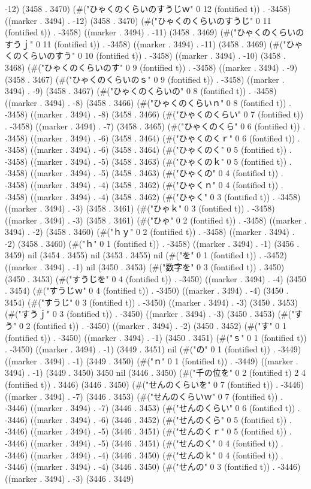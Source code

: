 -12) (3458 . 3470) (#("ひゃくのくらいのすうじｗ" 0 12 (fontified t)) . -3458) ((marker . 3494) . -12) (3458 . 3470) (#("ひゃくのくらいのすうじ" 0 11 (fontified t)) . -3458) ((marker . 3494) . -11) (3458 . 3469) (#("ひゃくのくらいのすうｊ" 0 11 (fontified t)) . -3458) ((marker . 3494) . -11) (3458 . 3469) (#("ひゃくのくらいのすう" 0 10 (fontified t)) . -3458) ((marker . 3494) . -10) (3458 . 3468) (#("ひゃくのくらいのす" 0 9 (fontified t)) . -3458) ((marker . 3494) . -9) (3458 . 3467) (#("ひゃくのくらいのｓ" 0 9 (fontified t)) . -3458) ((marker . 3494) . -9) (3458 . 3467) (#("ひゃくのくらいの" 0 8 (fontified t)) . -3458) ((marker . 3494) . -8) (3458 . 3466) (#("ひゃくのくらいｎ" 0 8 (fontified t)) . -3458) ((marker . 3494) . -8) (3458 . 3466) (#("ひゃくのくらい" 0 7 (fontified t)) . -3458) ((marker . 3494) . -7) (3458 . 3465) (#("ひゃくのくら" 0 6 (fontified t)) . -3458) ((marker . 3494) . -6) (3458 . 3464) (#("ひゃくのくｒ" 0 6 (fontified t)) . -3458) ((marker . 3494) . -6) (3458 . 3464) (#("ひゃくのく" 0 5 (fontified t)) . -3458) ((marker . 3494) . -5) (3458 . 3463) (#("ひゃくのｋ" 0 5 (fontified t)) . -3458) ((marker . 3494) . -5) (3458 . 3463) (#("ひゃくの" 0 4 (fontified t)) . -3458) ((marker . 3494) . -4) (3458 . 3462) (#("ひゃくｎ" 0 4 (fontified t)) . -3458) ((marker . 3494) . -4) (3458 . 3462) (#("ひゃく" 0 3 (fontified t)) . -3458) ((marker . 3494) . -3) (3458 . 3461) (#("ひゃｋ" 0 3 (fontified t)) . -3458) ((marker . 3494) . -3) (3458 . 3461) (#("ひゃ" 0 2 (fontified t)) . -3458) ((marker . 3494) . -2) (3458 . 3460) (#("ｈｙ" 0 2 (fontified t)) . -3458) ((marker . 3494) . -2) (3458 . 3460) (#("ｈ" 0 1 (fontified t)) . -3458) ((marker . 3494) . -1) (3456 . 3459) nil (3454 . 3455) nil (3453 . 3455) nil (#("を" 0 1 (fontified t)) . -3452) ((marker . 3494) . -1) nil (3450 . 3453) (#("数字を" 0 3 (fontified t)) . 3450) (3450 . 3453) (#("すうじを" 0 4 (fontified t)) . -3450) ((marker . 3494) . -4) (3450 . 3454) (#("すうじｗ" 0 4 (fontified t)) . -3450) ((marker . 3494) . -4) (3450 . 3454) (#("すうじ" 0 3 (fontified t)) . -3450) ((marker . 3494) . -3) (3450 . 3453) (#("すうｊ" 0 3 (fontified t)) . -3450) ((marker . 3494) . -3) (3450 . 3453) (#("すう" 0 2 (fontified t)) . -3450) ((marker . 3494) . -2) (3450 . 3452) (#("す" 0 1 (fontified t)) . -3450) ((marker . 3494) . -1) (3450 . 3451) (#("ｓ" 0 1 (fontified t)) . -3450) ((marker . 3494) . -1) (3449 . 3451) nil (#("の" 0 1 (fontified t)) . -3449) ((marker . 3494) . -1) (3449 . 3450) (#("ｎ" 0 1 (fontified t)) . -3449) ((marker . 3494) . -1) (3449 . 3450) 3450 nil (3446 . 3450) (#("千の位を" 0 2 (fontified t) 2 4 (fontified t)) . 3446) (3446 . 3450) (#("せんのくらいを" 0 7 (fontified t)) . -3446) ((marker . 3494) . -7) (3446 . 3453) (#("せんのくらいｗ" 0 7 (fontified t)) . -3446) ((marker . 3494) . -7) (3446 . 3453) (#("せんのくらい" 0 6 (fontified t)) . -3446) ((marker . 3494) . -6) (3446 . 3452) (#("せんのくら" 0 5 (fontified t)) . -3446) ((marker . 3494) . -5) (3446 . 3451) (#("せんのくｒ" 0 5 (fontified t)) . -3446) ((marker . 3494) . -5) (3446 . 3451) (#("せんのく" 0 4 (fontified t)) . -3446) ((marker . 3494) . -4) (3446 . 3450) (#("せんのｋ" 0 4 (fontified t)) . -3446) ((marker . 3494) . -4) (3446 . 3450) (#("せんの" 0 3 (fontified t)) . -3446) ((marker . 3494) . -3) (3446 . 3449) 